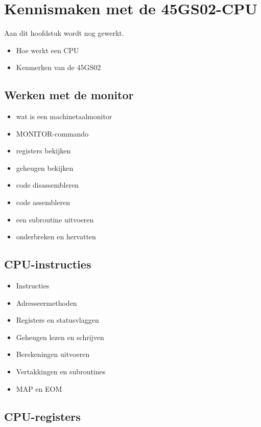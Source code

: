 \chapter{Kennismaken met de 45GS02-CPU}
\label{cha:introducing-the-45gs02-cpu}

Aan dit hoofdstuk wordt nog gewerkt.

\begin{itemize}
\item Hoe werkt een CPU\item Kenmerken van de 45GS02
\end{itemize}

\section{Werken met de monitor}

\begin{itemize}
    \item wat is een machinetaalmonitor\item MONITOR-commando\item registers bekijken\item geheugen bekijken\item code disassembleren\item code assembleren\item een subroutine uitvoeren\item onderbreken en hervatten
\end{itemize}

\section{CPU-instructies}

\begin{itemize}
    \item Instructies\item Adresseermethoden
\end{itemize}

\begin{itemize}
    \item Registers en statusvlaggen\item Geheugen lezen en schrijven\item Berekeningen uitvoeren\item Vertakkingen en subroutines\item MAP en EOM
\end{itemize}

\section{CPU-registers}

